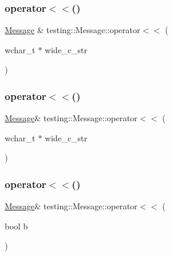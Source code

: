 \mbox{\label{classtesting_1_1_message_ac1d3a041ac4bb9c929ee746b31a13d6a}} 
\subsubsection{\texorpdfstring{operator$<$$<$()}{operator<<()}\hspace{0.1cm}{\footnotesize\ttfamily [14/18]}}
{\footnotesize\ttfamily \mbox{\hyperlink{classtesting_1_1_message}{Message}} \& testing\+::\+Message\+::operator$<$$<$ (\begin{DoxyParamCaption}\item[{wchar\+\_\+t $\ast$}]{wide\+\_\+c\+\_\+str }\end{DoxyParamCaption})}

\mbox{\label{classtesting_1_1_message_aae57eefb3a72a19c11453d630b1d846c}} 
\subsubsection{\texorpdfstring{operator$<$$<$()}{operator<<()}\hspace{0.1cm}{\footnotesize\ttfamily [15/18]}}
{\footnotesize\ttfamily \mbox{\hyperlink{classtesting_1_1_message}{Message}}\& testing\+::\+Message\+::operator$<$$<$ (\begin{DoxyParamCaption}\item[{wchar\+\_\+t $\ast$}]{wide\+\_\+c\+\_\+str }\end{DoxyParamCaption})}

\mbox{\label{classtesting_1_1_message_a3e1e04f23b1bdfe18adfd59928296346}} 
\subsubsection{\texorpdfstring{operator$<$$<$()}{operator<<()}\hspace{0.1cm}{\footnotesize\ttfamily [16/18]}}
{\footnotesize\ttfamily \mbox{\hyperlink{classtesting_1_1_message}{Message}}\& testing\+::\+Message\+::operator$<$$<$ (\begin{DoxyParamCaption}\item[{bool}]{b }\end{DoxyParamCaption})\hspace{0.3cm}{\ttfamily [inline]}}

